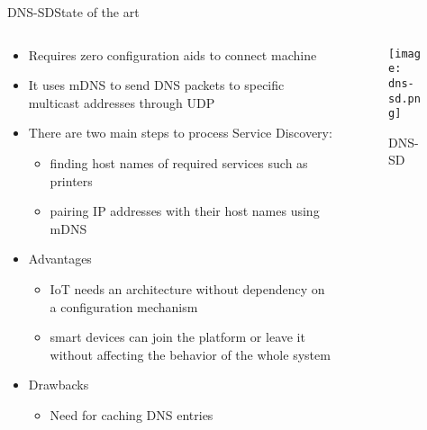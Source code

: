 \begin{frame}{DNS-SD}{State of the art}
	\begin{columns}
		\begin{column}{0.6\textwidth}
		
			\begin{itemize}
				\item Requires zero configuration aids to connect machine
				\item It uses mDNS to send DNS packets to specific multicast addresses through UDP
				\item There are two main steps to process Service Discovery:
					\begin{itemize}
						\item finding host names of required services such as printers
						\item pairing IP addresses with their host names using mDNS
					\end{itemize}
				\item Advantages
					\begin{itemize}
						\item IoT needs an architecture without dependency on a configuration mechanism
						\item smart devices can join the platform or leave it without affecting the behavior of the whole system
					\end{itemize}
				\item Drawbacks
					\begin{itemize}
						\item Need for caching DNS entries
					\end{itemize}
			\end{itemize}
			
		\end{column}
		
		\begin{column}{0.4\textwidth}
			\begin{center}
			
				\begin{figure}
					\texttt{[image: dns-sd.png]}
					\caption{\label{fig:dns-sd} DNS-SD}
				\end{figure}
				
			\end{center}
		\end{column}
		
	\end{columns}
	
\end{frame}

